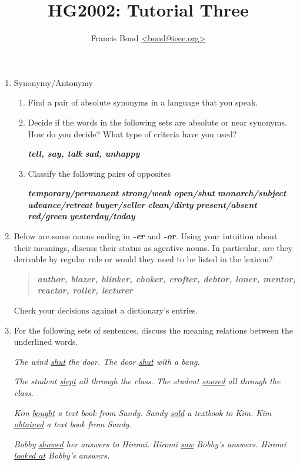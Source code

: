\documentclass[a4paper]{article}
\title{\vspace*{-30mm}HG2002: Tutorial Three}
\author{Francis Bond \url{<bond@ieee.org>}}
\date{}%
\newcommand{\lex}[1]{\textbf{\textit{#1}}}
\newcommand{\ix}{\ex\it}
\newcommand{\ul}[1]{\uline{#1}}
\begin{document}
\maketitle

\begin{enumerate}
\item Synonymy/Antonymy
  \begin{enumerate}
  \item Find a pair of absolute synonyms in a language that you speak.
  \item Decide if the words in the following sets are absolute or 
near synonyms. How do you decide? What
type of criteria have you used?
\begin{exe}
  \ex \lex{tell, say, talk}
  \ex \lex{sad, unhappy}
\end{exe}
\item  Classify the following pairs of opposites
\begin{multicols}{2}
\begin{exe}
  \ex \lex{temporary/permanent}
  \ex \lex{strong/weak}
  \ex \lex{open/shut}
  \ex \lex{monarch/subject} 
  \ex \lex{advance/retreat}
  \ex \lex{buyer/seller}
  \ex \lex{clean/dirty}
  \ex \lex{present/absent} 
  \ex \lex{red/green}
  \ex \lex{yesterday/today}
\end{exe}
\end{multicols}
\end{enumerate}

\item  Below are some nouns ending in \lex{-er} and \lex{-or}. Using your intuition
about their meanings, discuss their status as agentive nouns. In
particular, are they derivable by regular rule or would they need to
be listed in the lexicon?
\begin{quote}
\lex{author, blazer, blinker, choker, crofter, debtor, loner, mentor,
reactor, roller, lecturer}
\end{quote}
Check your decisions against a dictionary's entries.
\item For the following sets of sentences, discuss the meaning relations
  between the underlined words.
  \begin{exe}
    \ex 
    \begin{xlist}
      \ix The wind \ul{shut} the door.
      \ix The door \ul{shut} with a bang.
    \end{xlist}
    \ex 
    \begin{xlist}
      \ix The student \ul{slept} all through the class.
      \ix The student \ul{snored} all through the class.
    \end{xlist}
   \ex 
    \begin{xlist}
      \ix Kim \ul{bought} a text book from Sandy.
      \ix Sandy \ul{sold} a textbook to Kim.
      \ix Kim \ul{obtained} a text book from Sandy.
    \end{xlist}
   \ex 
    \begin{xlist}
      \ix Bobby \ul{showed} her answers to  Hiromi.
      \ix Hiromi \ul{saw} Bobby's answers.
      \ix Hiromi \ul{looked at} Bobby's answers.
    \end{xlist}
  \end{exe}


\end{enumerate}
\end{document}
